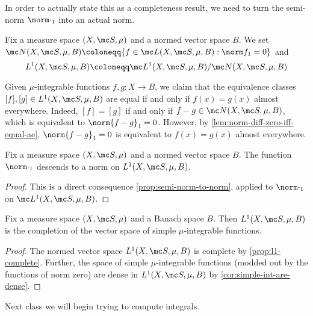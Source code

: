 \documentclass[../notes.tex]{subfiles}
\begin{document}
In order to actually state this as a completeness result, we need to turn the semi-norm $\norm\cdot_1$ into an actual norm.
\begin{notation}
	Fix a measure space $(X,\mc S,\mu)$ and a normed vector space $B$. We set $\mc N(X,\mc S,\mu,B)\coloneqq\{f\in\mc L(X,\mc S,\mu,B):\norm f_1=0\}$ and
	\[L^1(X,\mc S,\mu,B)\coloneqq\mc L^1(X,\mc S,\mu,B)/\mc N(X,\mc S,\mu,B)\]
\end{notation}
\begin{remark}
	Given $\mu$-integrable functions $f,g\colon X\to B$, we claim that the equivalence classes $[f],[g]\in L^1(X,\mc S,\mu,B)$ are equal if and only if $f(x)=g(x)$ almost everywhere. Indeed, $[f]=[g]$ if and only if $f-g\in\mc N(X,\mc S,\mu,B)$, which is equivalent to $\norm{f-g}_1=0$. However, by \autoref{lem:norm-diff-zero-iff-equal-ae}, $\norm{f-g}_1=0$ is equivalent to $f(x)=g(x)$ almost everywhere.
\end{remark}
\begin{lemma}
	Fix a measure space $(X,\mc S,\mu)$ and a normed vector space $B$. The function $\norm\cdot_1$ descends to a norm on $L^1(X,\mc S,\mu,B)$.
\end{lemma}
\begin{proof}
	This is a direct consequence \autoref{prop:semi-norm-to-norm}, applied to $\norm\cdot_1$ on $\mc L^1(X,\mc S,\mu,B)$.
\end{proof}
\begin{corollary} \label{cor:l1-complete}
	Fix a measure space $(X,\mc S,\mu)$ and a Banach space $B$. Then $L^1(X,\mc S,\mu,B)$ is the completion of the vector space of simple $\mu$-integrable functions.
\end{corollary}
\begin{proof}
	The normed vector space $L^1(X,\mc S,\mu,B)$ is complete by \autoref{prop:l1-complete}. Further, the space of simple $\mu$-integrable functions (modded out by the functions of norm zero) are dense in $L^1(X,\mc S,\mu,B)$ by \autoref{cor:simple-int-are-dense}.
\end{proof}
Next class we will begin trying to compute integrals.
\end{document}
